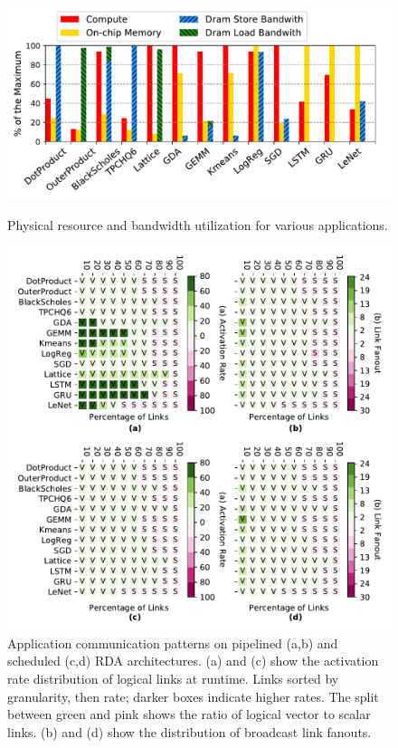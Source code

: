 \begin{figure}
\centering
\includegraphics[width=0.8\columnwidth]{network/figs/util_bw2.pdf}
\caption[Resource and bandwidth utilization]{
  Physical resource and bandwidth utilization for various applications.}\label{fig:util_bw}
\centering
\includegraphics[width=0.8\columnwidth]{network/figs/link7.pdf}
  \caption[Application communication patterns]{Application communication patterns on pipelined (a,b) and scheduled (c,d) RDA architectures.
  (a) and (c) show the activation rate distribution of logical links at runtime. 
  Links sorted by granularity, then rate; darker boxes indicate higher rates.
  The split between green and pink shows the ratio of logical vector to scalar links. (b) and (d) show the distribution of broadcast link fanouts.
 }\label{fig:link}
\end{figure}

